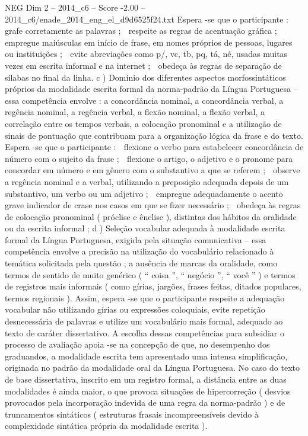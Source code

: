 \begin{textsample}{NEG Dim 2 – 2014\_c6 – Score -2.00 – 2014\_c6/enade\_2014\_eng\_el\_d9d6525f24.txt}
Espera -se que o participante :  grafe corretamente as palavras ;  respeite as regras de acentuação gráfica ;  empregue maiúsculas em início de frase, em nomes próprios de pessoas, lugares ou instituições ;  evite abreviações como p/, vc, tb, pq, tá, né, usadas muitas vezes em escrita informal e na internet ;  obedeça às regras de separação de sílabas no final da linha. c ) Domínio dos diferentes aspectos morfossintáticos próprios da modalidade escrita formal da norma-padrão da Língua Portuguesa – essa competência envolve : a concordância nominal, a concordância verbal, a regência nominal, a regência verbal, a flexão nominal, a flexão verbal, a correlação entre os tempos verbais, a colocação pronominal e a utilização de sinais de pontuação que contribuam para a organização lógica da frase e do texto.
Espera -se que o participante :  flexione o verbo para estabelecer concordância de número com o sujeito da frase ;  flexione o artigo, o adjetivo e o pronome para concordar em número e em gênero com o substantivo a que se referem ;  observe a regência nominal e a verbal, utilizando a preposição adequada depois de um substantivo, um verbo ou um adjetivo ;  empregue adequadamente o acento grave indicador de crase nos casos em que se fizer necessário ;  obedeça às regras de colocação pronominal ( próclise e ênclise ), distintas dos hábitos da oralidade ou da escrita informal ; d ) Seleção vocabular adequada à modalidade escrita formal da Língua Portuguesa, exigida pela situação comunicativa – essa competência envolve a precisão na utilização do vocabulário relacionado à temática solicitada pela questão ; a ausência de marcas da oralidade, como termos de sentido de muito genérico ( “ coisa ”, “ negócio ”, “ você ” ) e termos de registros mais informais ( como gírias, jargões, frases feitas, ditados populares, termos regionais ).
Assim, espera -se que o participante respeite a adequação vocabular não utilizando gírias ou expressões coloquiais, evite repetição desnecessária de palavras e utilize um vocabulário mais formal, adequado ao texto de caráter dissertativo.
A escolha dessas competências para subsidiar o processo de avaliação apoia -se na concepção de que, no desempenho dos graduandos, a modalidade escrita tem apresentado uma intensa simplificação, originada no padrão da modalidade oral da Língua Portuguesa.
No caso do texto de base dissertativa, inscrito em um registro formal, a distância entre as duas modalidades é ainda maior, o que provoca situações de hipercorreção ( desvios provocados pela incorporação indevida de uma regra da norma-padrão ) e de truncamentos sintáticos ( estruturas frasais incompreensíveis devido à complexidade sintática própria da modalidade escrita ).

\end{textsample}
